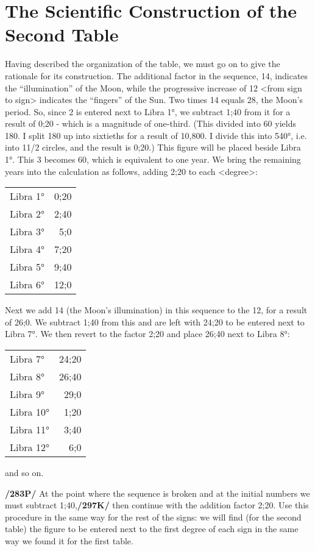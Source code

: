 \section{The Scientific Construction of the Second Table}

Having described the organization of the table, we must go on to give the rationale for its construction. The additional factor in the sequence, 14, indicates the “illumination” of the Moon, while the progressive
increase of 12 <from sign to sign> indicates the “fingers” of the Sun. Two times 14 equals 28, the Moon’s period. So, since 2 is entered next to Libra 1°, we subtract 1;40 from it for a result of 0;20 - which is a magnitude of one-third. (This divided into 60 yields 180. I split 180 up into sixtieths for a result of 10,800. I divide this into 540°, i.e. into 11/2 circles, and the result is 0;20.) This figure will be placed beside Libra 1°. This 3 becomes 60, which is equivalent to one year. We bring the remaining years into the calculation as follows, adding 2;20 to each <degree>:

\begin{tabular}{lr}
Libra 1° & 0;20 \\
Libra 2° & 2;40 \\
Libra 3° & 5;0 \\
Libra 4° & 7;20 \\
Libra 5° & 9;40 \\
Libra 6° & 12;0 \\
\end{tabular}

Next we add 14 (the Moon’s illumination) in this sequence to the 12, for a result of 26;0. We subtract 1;40 from this and are left with 24;20 to be entered next to Libra 7°. We then revert to the factor 2;20 and place 26;40 next to Libra 8°:

\begin{tabular}{lr}
Libra 7° & 24;20 \\
Libra 8° & 26;40 \\
Libra 9° & 29;0 \\
Libra 10° & 1;20 \\
Libra 11° & 3;40 \\
Libra 12° & 6;0 \\
\end{tabular}

and so on.

\textbf{/283P/} At the point where the sequence is broken and at the initial numbers we must subtract 1;40,\textbf{/297K/} then continue with the addition factor 2;20. Use this procedure in the same way for the rest of the signs: we will find (for the second table) the figure to be entered next to the first degree of each sign in the same way we found it for the first table.
\newpage